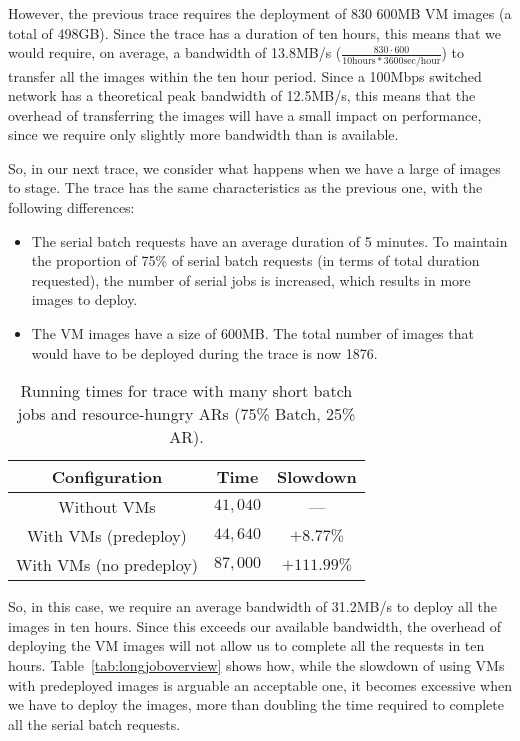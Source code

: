 However, the previous trace requires the deployment of 830 600MB VM images (a total of 498GB). Since the trace has a duration of ten hours, this means that we would require, on average, a bandwidth of 13.8MB/s ($\frac{830\cdot 600}{10\textrm{hours}*3600\textrm{sec/hour}}$) to transfer all the images within the ten hour period. Since a 100Mbps switched network has a theoretical peak bandwidth of 12.5MB/s, this means that the overhead of transferring the images will have a small impact on performance, since we require only slightly more bandwidth than is available.

So, in our next trace, we consider what happens when we have a large of images to stage. The trace has the same characteristics as the previous one, with the following differences:

\begin{itemize}
\item The serial batch requests have an average duration of 5 minutes. To maintain the proportion of 75\% of serial batch requests (in terms of total duration requested), the number of serial jobs is increased, which results in more images to deploy.
\item The VM images have a size of 600MB. The total number of images that would have to be deployed during the trace is now 1876. 
\end{itemize}

\begin{table}
\begin{center}
 \begin{tabular}{|c|c|c|}
\hline
 \textbf{Configuration} & \textbf{Time} & \textbf{Slowdown} \\\hline\hline
Without VMs & $41,040$ & --- \\\hline
With VMs (predeploy) & $44,640$ & $+8.77\%$ \\\hline 
With VMs (no predeploy) & $87,000$ & $+111.99\%$ \\\hline
\end{tabular}
\caption{Running times for trace with many short batch jobs and resource-hungry ARs (75\% Batch, 25\% AR).}
\label{tab:shortjoboverview}
\end{center}
\end{table}


So, in this case, we require an average bandwidth of 31.2MB/s to deploy all the images in ten hours. Since this exceeds our available bandwidth, the overhead of deploying the VM images will not allow us to complete all the requests in ten hours. Table~\ref{tab:longjoboverview} shows how, while the slowdown of using VMs with predeployed images is arguable an acceptable one, it becomes excessive when we have to deploy the images, more than doubling the time required to complete all the serial batch requests.

